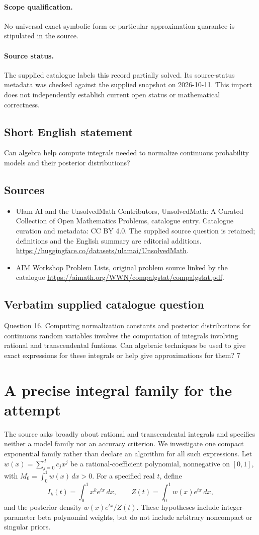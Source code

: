 \documentclass[11pt]{article}
\begin{document}
\paragraph{Scope qualification.}
No universal exact symbolic form or particular approximation guarantee is stipulated in the source.
\paragraph{Source status.}
The supplied catalogue labels this record partially solved. Its source-status metadata was checked against the supplied snapshot on 2026-10-11. This import does not independently establish current open status or mathematical correctness.
\subsection{Short English statement}
Can algebra help compute integrals needed to normalize continuous probability models and their posterior distributions?
\subsection{Sources}
\begin{itemize}
\item[S1] Ulam AI and the UnsolvedMath Contributors, UnsolvedMath: A Curated Collection of Open Mathematics Problems, catalogue entry. Catalogue curation and metadata: CC BY 4.0. The supplied source question is retained; definitions and the English summary are editorial additions.
\url{https://huggingface.co/datasets/ulamai/UnsolvedMath}.
\item[S2] AIM Workshop Problem Lists, original problem source linked by the catalogue
\url{https://aimath.org/WWN/compalgstat/compalgstat.pdf}.
\end{itemize}
\subsection{Verbatim supplied catalogue question}
Question 16. Computing normalization constants and posterior distributions for continuous random variables involves the computation of integrals involving rational and transcendental funtions. Can algebraic techniques be used to give exact expressions for these integrals or help give approximations for them? 7

\section{A precise integral family for the attempt}
The source asks broadly about rational and transcendental integrals and
specifies neither a model family nor an accuracy criterion. We investigate
one compact exponential family rather than declare an algorithm for all
such expressions. Let $w(x)=\sum_{j=0}^d c_jx^j$ be a rational-coefficient
polynomial, nonnegative on $[0,1]$, with
$M_0=\int_0^1w(x)\,dx>0$. For a specified real $t$, define
\[
I_k(t)=\int_0^1x^k e^{tx}\,dx,\qquad
Z(t)=\int_0^1w(x)e^{tx}\,dx,
\]
and the posterior density $w(x)e^{tx}/Z(t)$. These hypotheses include
integer-parameter beta polynomial weights, but do not include arbitrary
noncompact or singular priors.
\end{document}
